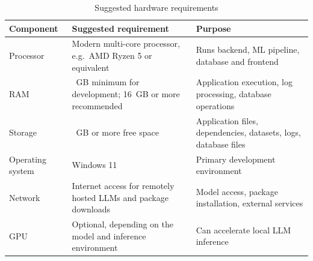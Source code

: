 \documentclass[12pt,a4paper]{report}
\renewcommand{\arraystretch}{1.05}
\begin{document}
\begin{table}[H]
\centering
\caption{Suggested hardware requirements}
\label{tab:hw}
\small
\renewcommand{\arraystretch}{1.2}
\begin{tabularx}{\textwidth}{l >{\raggedright\arraybackslash}p{5.6cm} >{\raggedright\arraybackslash}X}
\toprule
\textbf{Component} & \textbf{Suggested requirement} & \textbf{Purpose}\\
\midrule
Processor & Modern multi-core processor, e.g.\ AMD Ryzen 5 or equivalent & Runs backend, ML pipeline, database and frontend\\
RAM & 8~GB minimum for development; 16~GB or more recommended & Application execution, log processing, database operations\\
Storage & 8~GB or more free space & Application files, dependencies, datasets, logs, database files\\
Operating system & Windows 11 & Primary development environment\\
Network & Internet access for remotely hosted LLMs and package downloads & Model access, package installation, external services\\
GPU & Optional, depending on the model and inference environment & Can accelerate local LLM inference\\
\bottomrule
\end{tabularx}
\end{table}
\end{document}
